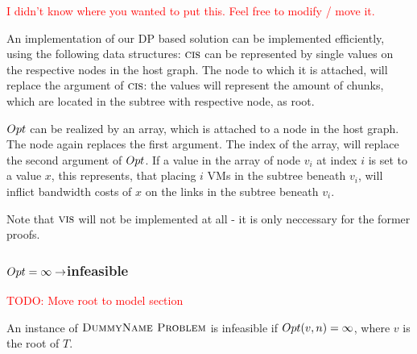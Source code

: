 \documentclass[9pt,twocolumn]{scrartcl}
\newcommand{\Problem}{\textsc{DummyName Problem}}
\newcommand{\carlo}[1]{\textcolor{red}{#1}}
\newcommand{\SubstrateNode}{\ensuremath{v}}
\newcommand{\Tree}{\ensuremath{T}}
\newcommand{\Vms}{\ensuremath{n}}
\begin{document}
\carlo{I didn't know where you wanted to put this. Feel free to modify / move
it.}

An implementation of our DP based solution can be implemented efficiently,
using the following data structures: $\textsc{cis}$ can be
represented by single values on the respective nodes in the host graph. The
node to which it is attached, will replace the argument of $\textsc{cis}$: the
values will represent the amount of chunks, which are located in the subtree
with respective node, as root.

$Opt$ can be realized by an array, which is attached to a node in the host
graph. The node again replaces the first argument. The index of the array, will
replace the second argument of $Opt$. If a value in the array of node
$\SubstrateNode_i$ at index $i$ is set to a value $x$, this represents, that
placing $i$ VMs in the subtree beneath $\SubstrateNode_i$, will inflict
bandwidth costs of $x$ on the links in the subtree beneath $\SubstrateNode_i$.

Note that $\textsc{vis}$ will not be implemented at all - it is only neccessary for
the former proofs.

\subsubsection{$Opt = \infty \rightarrow $infeasible}

\carlo{TODO: Move root to model section}

\begin{lemma}
An instance of $\Problem$ is infeasible if $\Opt(\SubstrateNode,\Vms) = \infty$,
where $\SubstrateNode$ is the root of $\Tree$.
\end{lemma}
\end{document}
